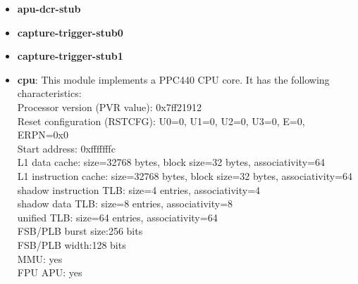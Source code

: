 \begin{itemize}\addtolength{\itemsep}{-0.40\baselineskip}
\item \textbf{apu-dcr-stub}
\item \textbf{capture-trigger-stub0}
\item \textbf{capture-trigger-stub1}
\item \textbf{cpu}: This module implements a PPC440 CPU core. It has the following characteristics:\\
Processor version (PVR value): 0x7ff21912\\
Reset configuration (RSTCFG): U0=0, U1=0, U2=0, U3=0, E=0, ERPN=0x0\\
Start address: 0xfffffffc\\
L1 data cache: size=32768 bytes, block size=32 bytes, associativity=64\\
L1 instruction cache: size=32768 bytes, block size=32 bytes, associativity=64\\
shadow instruction TLB: size=4 entries, associativity=4\\
shadow data TLB: size=8 entries, associativity=8\\
unified TLB: size=64 entries, associativity=64\\
FSB/PLB burst size:256 bits\\
FSB/PLB width:128 bits\\
MMU: yes\\
FPU APU: yes\\


\end{itemize}
